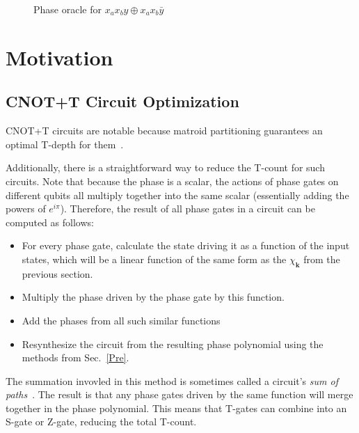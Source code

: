 \begin{figure*}[t]
  \centering
  \begin{minipage}{\textwidth}
    \centering
    \scalebox{0.9} {
      
    }
    \scalebox{0.9} {
      
    }
  \end{minipage}
  \caption{Phase oracle for $x_a x_b y \oplus x_a x_b \bar{y}$}
  \label{fig-series-all}
\end{figure*}

\section{Motivation}
\label{Mot}
\subsection{CNOT+T Circuit Optimization}
\label{Mot:CnotOpt}
CNOT+T circuits are notable because matroid partitioning guarantees an optimal T-depth
for them~\cite{bib-amy-matroid}.

Additionally, there is a straightforward way to reduce the T-count for such circuits.
Note that because the phase is a scalar, the actions of phase gates on different
qubits all multiply together into the same scalar (essentially adding the powers
of $e^{i \pi}$). Therefore, the result of all phase gates in a circuit
can be computed as follows:

\begin{itemize}
\item For every phase gate, calculate the state driving it as a function of the
  input states, which will be a linear function of the same form as the
  $\chi_{\mathbf{k}}$ from the previous section.
\item Multiply the phase driven by the phase gate by this function.
\item Add the phases from all such similar functions 
\item Resynthesize the circuit from the resulting phase polynomial using
  the methods from Sec.~\ref{Pre}.
\end{itemize}

The summation invovled in this method is sometimes called a circuit's {\it sum of paths}~\cite{bib-amy-cnot}.
The result is that any phase gates driven by the same function will merge
together in the phase polynomial. This means that T-gates
can combine into an S-gate or Z-gate, reducing the total T-count.

